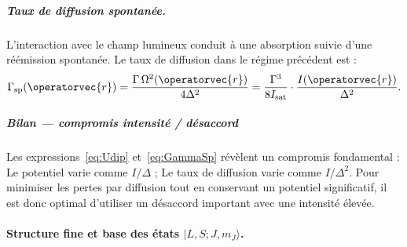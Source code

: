 

\subparagraph{Taux de diffusion spontanée.}

L’interaction avec le champ lumineux conduit à une absorption suivie d’une réémission spontanée. Le taux de diffusion dans le régime précédent est :
\begin{eqnarray}
\Gamma_{\mathrm{sp}}(\operatorvec{r}) = \frac{\Gamma \, \Omega^2(\operatorvec{r})}{4 \Delta^2}
= \frac{\Gamma^3}{8 I_{\mathrm{sat}}} \cdot \frac{I(\operatorvec{r})}{\Delta^2}.
\label{eq:GammaSp}
\end{eqnarray}

\subparagraph{Bilan — compromis intensité / désaccord}

Les expressions~\eqref{eq:Udip} et~\eqref{eq:GammaSp} révèlent un compromis fondamental : Le potentiel varie comme $I / \Delta$ ; Le taux de diffusion varie comme $I / \Delta^2$.
Pour minimiser les pertes par diffusion tout en conservant un potentiel significatif, il est donc optimal d’utiliser un désaccord important avec une intensité élevée. %





\paragraph{Structure fine et base des états $|L, S; J, m_J\rangle$.}

